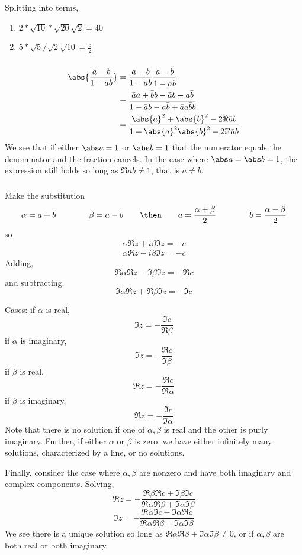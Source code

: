 \subsubsection{}
Splitting into terms,
\begin{enumerate}[label = (\alph*)]
	\item \(2*\sqrt{10}*\sqrt{20}\sqrt{2}=40\)
	\item \(5*\sqrt{5}/\sqrt{2}\sqrt{10} = \frac{5}{2}\)
\end{enumerate}
\subsubsection{}
\begin{align*}
	\abs{\frac{a-b}{1-\bar a b}}&=\frac{a-b}{1-\bar a b}\frac{\bar a - \bar b}{1-a \bar b}\\
				    &=\frac{\bar a a + \bar b b -\bar a b - a\bar b}{1-\bar a b -a\bar b + \bar a a\bar b b}\\
				    &=\frac{\abs{a}^2+\abs{b}^2-2\Re{\bar a b}}{1+\abs{a}^2\abs{b}^2 - 2\Re{\bar a b}}
\end{align*}
We see that if either \(\abs a = 1\) or \(\abs b = 1\) that the numerator equals the denominator and the fraction cancels. In the case where \(\abs a = \abs b = 1\), the expression still holds so long as \(\Re \bar a b\neq 1\), that is \(a\neq b\).
\subsubsection{}
Make the substitution
\[\alpha = a+b\qquad\qquad \beta = a-b\qquad\then\qquad a = \frac{\alpha+\beta}{2}\qquad\qquad b = \frac{\alpha-\beta}{2}\]
so
\[\alpha\Re z + i\beta\Im z = -c\]
\[\bar \alpha \Re z - i \bar \beta \Im z = -\bar c\]
Adding,
\[\Re\alpha \Re z -\Im \beta \Im z = -\Re c\]
and subtracting,
\[\Im \alpha\Re z +\Re\beta\Im z = -\Im c\]

Cases:
if \(\alpha\) is real, 
\[\Im z = -\frac{\Im c}{\Re \beta}\]
if \(\alpha\) is imaginary,
\[\Im z = -\frac{\Re c}{\Im \beta}\]
if \(\beta\) is real, 
\[\Re z = -\frac{\Re c}{\Re \alpha}\]
if \(\beta\) is imaginary,
\[\Re z = -\frac{\Im c}{\Im\alpha}\]
Note that there is no solution if one of \(\alpha,\beta\) is real and the other is purly imaginary. Further, if either \(\alpha\) or \(\beta\) is zero, we have either infinitely many solutions, characterized by a line, or no solutions.

Finally, consider the case where \(\alpha,\beta\) are nonzero and have both imaginary and complex components. Solving,
\[\Re z = -\frac{\Re \beta\Re c+\Im\beta\Im c}{\Re\alpha\Re\beta +\Im\alpha\Im\beta}\]
\[\Im z = -\frac{\Re\alpha\Im c -\Im\alpha\Re c}{\Re\alpha\Re\beta + \Im\alpha\Im\beta}\]
We see there is a unique solution so long as \(\Re\alpha\Re\beta+\Im\alpha\Im\beta\neq 0\), or if \(\alpha,\beta\) are both real or both imaginary.

